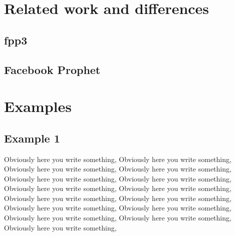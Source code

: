 \documentclass{article}
\begin{document}
\section{Related work and differences}

\subsection{fpp3}

\subsection{Facebook Prophet}

\section{Examples}

\subsection{Example 1}

Obviously here you write something, Obviously here you write something, Obviously here you write something, Obviously here you write something, Obviously here you write something, Obviously here you write something, Obviously here you write something, Obviously here you write something, Obviously here you write something, Obviously here you write something, Obviously here you write something, Obviously here you write something, Obviously here you write something, Obviously here you write something, Obviously here you write something, 
\end{document}
